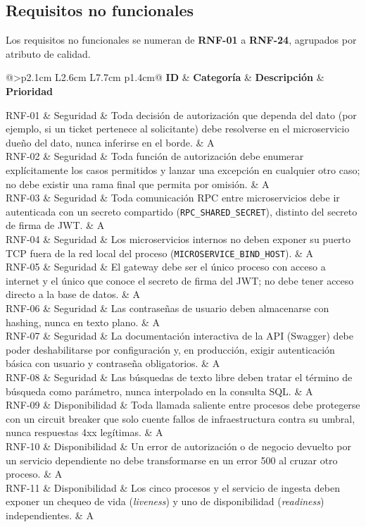 \documentclass[11pt,a4paper]{article}
\makeatletter
\newcommand{\reqtable}[1]{%
  \begin{longtable}{@{}>{\bfseries}p{2.1cm} L{2.6cm} L{7.7cm} p{1.4cm}@{}}
  \toprule
  \textbf{ID} & \textbf{Categoría} & \textbf{Descripción} & \textbf{Prioridad} \\
  \midrule
  \endhead
  #1
  \bottomrule
  \end{longtable}
}
\makeatother
\begin{document}
\subsection{Requisitos no funcionales}

Los requisitos no funcionales se numeran de \textbf{RNF-01} a
\textbf{RNF-24}, agrupados por atributo de calidad.

\reqtable{
RNF-01 & Seguridad & Toda decisión de autorización que dependa del dato (por ejemplo, si un ticket pertenece al solicitante) debe resolverse en el microservicio dueño del dato, nunca inferirse en el borde. & A \\
RNF-02 & Seguridad & Toda función de autorización debe enumerar explícitamente los casos permitidos y lanzar una excepción en cualquier otro caso; no debe existir una rama final que permita por omisión. & A \\
RNF-03 & Seguridad & Toda comunicación RPC entre microservicios debe ir autenticada con un secreto compartido (\texttt{RPC\_SHARED\_SECRET}), distinto del secreto de firma de JWT. & A \\
RNF-04 & Seguridad & Los microservicios internos no deben exponer su puerto TCP fuera de la red local del proceso (\texttt{MICROSERVICE\_BIND\_HOST}). & A \\
RNF-05 & Seguridad & El gateway debe ser el único proceso con acceso a internet y el único que conoce el secreto de firma del JWT; no debe tener acceso directo a la base de datos. & A \\
RNF-06 & Seguridad & Las contraseñas de usuario deben almacenarse con hashing, nunca en texto plano. & A \\
RNF-07 & Seguridad & La documentación interactiva de la API (Swagger) debe poder deshabilitarse por configuración y, en producción, exigir autenticación básica con usuario y contraseña obligatorios. & A \\
RNF-08 & Seguridad & Las búsquedas de texto libre deben tratar el término de búsqueda como parámetro, nunca interpolado en la consulta SQL. & A \\
RNF-09 & Disponibilidad & Toda llamada saliente entre procesos debe protegerse con un circuit breaker que solo cuente fallos de infraestructura contra su umbral, nunca respuestas 4xx legítimas. & A \\
RNF-10 & Disponibilidad & Un error de autorización o de negocio devuelto por un servicio dependiente no debe transformarse en un error 500 al cruzar otro proceso. & A \\
RNF-11 & Disponibilidad & Los cinco procesos y el servicio de ingesta deben exponer un chequeo de vida (\emph{liveness}) y uno de disponibilidad (\emph{readiness}) independientes. & A \\
}
\end{document}
